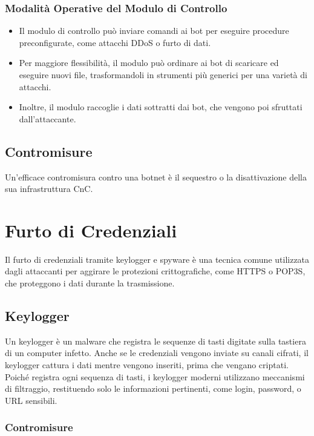 \subsubsection{Modalità Operative del Modulo di Controllo}

\begin{itemize}
    \item Il modulo di controllo può inviare comandi ai bot per eseguire procedure preconfigurate, come attacchi DDoS o furto di dati.
    \item Per maggiore flessibilità, il modulo può ordinare ai bot di scaricare ed eseguire nuovi file, trasformandoli in strumenti più generici per una varietà di attacchi.
    \item Inoltre, il modulo raccoglie i dati sottratti dai bot, che vengono poi sfruttati dall'attaccante.
\end{itemize}

\subsection{Contromisure}

Un'efficace contromisura contro una botnet è il sequestro o la disattivazione della sua infrastruttura CnC.

\section{Furto di Credenziali}

Il furto di credenziali tramite keylogger e spyware è una tecnica comune utilizzata dagli attaccanti per aggirare le protezioni crittografiche, come HTTPS o POP3S, che proteggono i dati durante la trasmissione.

\subsection{Keylogger}

Un keylogger è un malware che registra le sequenze di tasti digitate sulla tastiera di un computer infetto. Anche se le credenziali vengono inviate su canali cifrati, il keylogger cattura i dati mentre vengono inseriti, prima che vengano criptati. Poiché registra ogni sequenza di tasti, i keylogger moderni utilizzano meccanismi di filtraggio, restituendo solo le informazioni pertinenti, come login, password, o URL sensibili.

\subsubsection{Contromisure}

